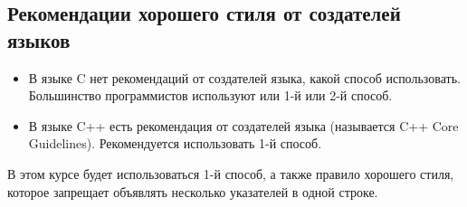 \documentclass[10pt]{article}
\begin{document}
\subsection*{Рекомендации хорошего стиля от создателей языков}
\begin{itemize}
\item В языке C нет рекомендаций от создателей языка, какой способ использовать.
Большинство программистов используют или 1-й или 2-й способ.
\item В языке C++ есть рекомендация от создателей языка (называется C++ Core Guidelines).
Рекомендуется использовать 1-й способ.
\end{itemize}

В этом курсе будет использоваться 1-й способ, а также правило хорошего стиля, которое запрещает объявлять несколько указателей в одной строке.
\end{document}
